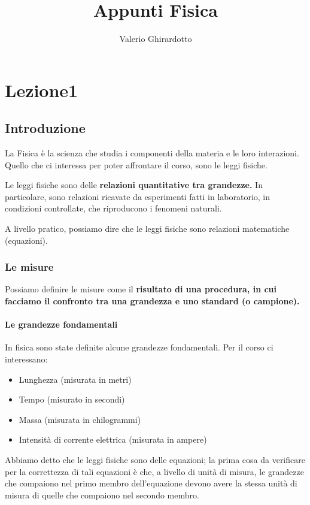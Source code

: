 \documentclass[a4paper]{book}
\begin{document}
\title{Appunti Fisica}
\author{Valerio Ghirardotto}
\maketitle
\tableofcontents
\chapter{Lezione1}

\section{Introduzione}
La Fisica è la  scienza che studia i componenti della materia e le loro interazioni. Quello che ci interessa per poter affrontare il corso, sono le leggi fisiche.

Le leggi fisiche sono delle \textbf{relazioni quantitative tra grandezze.} In particolare, sono relazioni ricavate da esperimenti fatti  in laboratorio,  in  condizioni controllate, che riproducono i fenomeni naturali.

A livello pratico,  possiamo dire che le leggi fisiche sono relazioni matematiche (equazioni).

\subsection{Le misure}
Possiamo definire le misure come il \textbf{risultato di una procedura, in cui facciamo il confronto tra una grandezza e uno standard (o campione).}

\subsubsection{Le grandezze fondamentali}
In fisica sono state definite alcune grandezze fondamentali.  Per il corso ci interessano:
\begin{itemize}
	\item Lunghezza (misurata in metri)
	\item Tempo (misurato in secondi)
	\item Massa (misurata in chilogrammi)
	\item Intensità di corrente elettrica (misurata in ampere)
\end{itemize}

Abbiamo detto che le leggi fisiche sono delle equazioni; la prima cosa da verificare per la correttezza di tali equazioni è che,  a livello di unità di misura,  le grandezze che compaiono nel primo membro dell'equazione devono avere la stessa unità di misura di quelle che compaiono nel secondo membro. 
\end{document}
